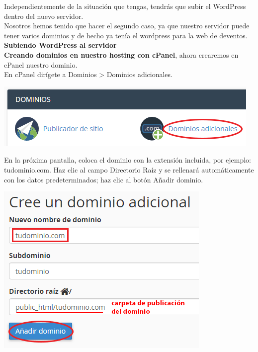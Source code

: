 \begin{enumerate}
		
		Independientemente de la situación que tengas, tendrás que subir el WordPress dentro del nuevo servidor.\\
		
		Nosotros hemos tenido que hacer el segundo caso, ya que nuestro servidor puede tener varios dominios y de hecho ya tenía el wordpress para la web de deventos.\\
		
		\textbf{Subiendo WordPress al servidor}\\
		
		\textbf{Creando dominios en nuestro hosting con cPanel}, ahora crearemos en cPanel nuestro dominio.\\
		
		En cPanel dirígete a Dominios > Dominios adicionales.
		
		\begin{center}
			\includegraphics[scale=0.4]{image/migra17.png}
		\end{center}
		
		En la próxima pantalla, coloca el dominio con la extensión incluida, por ejemplo: tudominio.com. Haz clic al campo Directorio Raíz y se rellenará automáticamente con los datos predeterminados; haz clic al botón Añadir dominio.
		
		\begin{center}
			\includegraphics[scale=0.4]{image/migra18.png}
		\end{center}
		

\end{enumerate}
